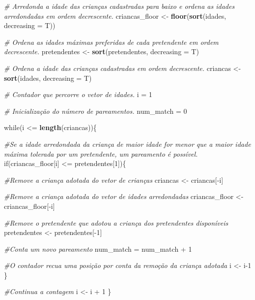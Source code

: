 \documentclass[]{book}
\newenvironment{Shaded}{\begin{snugshade}}{\end{snugshade}}
\newcommand{\KeywordTok}[1]{\textcolor[rgb]{0.13,0.29,0.53}{\textbf{{#1}}}}
\newcommand{\DataTypeTok}[1]{\textcolor[rgb]{0.13,0.29,0.53}{{#1}}}
\newcommand{\DecValTok}[1]{\textcolor[rgb]{0.00,0.00,0.81}{{#1}}}
\newcommand{\StringTok}[1]{\textcolor[rgb]{0.31,0.60,0.02}{{#1}}}
\newcommand{\CommentTok}[1]{\textcolor[rgb]{0.56,0.35,0.01}{\textit{{#1}}}}
\newcommand{\NormalTok}[1]{{#1}}
\begin{document}
\begin{Shaded}
\begin{Highlighting}[]
  \CommentTok{# Arredonda a idade das crianças cadastradas para baixo e ordena as idades arredondadas em ordem decrescente.}
  \NormalTok{criancas_floor <-}\StringTok{ }\KeywordTok{floor}\NormalTok{(}\KeywordTok{sort}\NormalTok{(idades, }\DataTypeTok{decreasing =} \NormalTok{T))}

  \CommentTok{# Ordena as idades máximas preferidas de cada pretendente em ordem decrescente.}
  \NormalTok{pretendentes <-}\StringTok{ }\KeywordTok{sort}\NormalTok{(pretendentes, }\DataTypeTok{decreasing =} \NormalTok{T)}
  
  \CommentTok{# Ordena a idade das crianças cadastradas em ordem decrescente.}
  \NormalTok{criancas <-}\StringTok{ }\KeywordTok{sort}\NormalTok{(idades, }\DataTypeTok{decreasing =} \NormalTok{T)}

  \CommentTok{# Contador que percorre o vetor de idades.}
  \NormalTok{i =}\StringTok{ }\DecValTok{1}
  
  \CommentTok{# Inicialização do número de pareamentos.}
  \NormalTok{num_match =}\StringTok{ }\DecValTok{0}
  
  \NormalTok{while(i <=}\StringTok{ }\KeywordTok{length}\NormalTok{(criancas))\{}

    \CommentTok{#Se a idade arredondada da criança de maior idade for menor que a maior idade máxima tolerada por um pretendente, um pareamento é possível. }
    \NormalTok{if(criancas_floor[i] <=}\StringTok{ }\NormalTok{pretendentes[}\DecValTok{1}\NormalTok{])\{}

      \CommentTok{#Remove a criança adotada do vetor de crianças}
      \NormalTok{criancas <-}\StringTok{ }\NormalTok{criancas[-i]}
      
      \CommentTok{#Remove a criança adotada do vetor de idades arredondadas}
      \NormalTok{criancas_floor <-}\StringTok{ }\NormalTok{criancas_floor[-i]}

      \CommentTok{#Remove o pretendente que adotou a criança dos pretendentes disponíveis}
      \NormalTok{pretendentes <-}\StringTok{ }\NormalTok{pretendentes[-}\DecValTok{1}\NormalTok{]}
      
      \CommentTok{#Conta um novo pareamento}
      \NormalTok{num_match =}\StringTok{ }\NormalTok{num_match +}\StringTok{ }\DecValTok{1}
      
      \CommentTok{#O contador recua uma posição por conta da remoção da criança adotada}
      \NormalTok{i <-}\StringTok{ }\NormalTok{i}\DecValTok{-1}
    \NormalTok{\}}
    
    \CommentTok{#Continua a contagem}
    \NormalTok{i <-}\StringTok{ }\NormalTok{i +}\StringTok{ }\DecValTok{1}
  \NormalTok{\}}
\end{Highlighting}
\end{Shaded}
\end{document}
